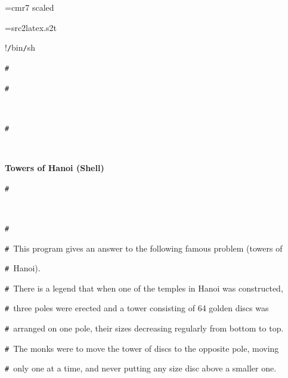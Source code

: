 \documentclass{article}
\begin{document}
\ifx\sevenrm\undefined
  \font\sevenrm=cmr7 scaled 
\fi

\newread\MyStyle
\openin\MyStyle=src2latex.s2t
\ifeof\MyStyle
  \closein\MyStyle
\else
  
  \closein\MyStyle
\fi

\def\mc{\relax}
\def\gt{\relax}
\def\sc{\scshape}

\tt\mc 

\noindent
\rm\mc {\tt\#}!{\tt /}bin{\tt /}sh

\noindent
\mbox{}{\tt\#}\  \hrulefill  \rm\mc 

\noindent
\mbox{}{\tt\#}
\tt\mc 

\noindent
\mbox{}\rm\mc {\tt\#}\  {}%

\noindent
\mbox{}{\tt\#}
\tt\mc 

\noindent
\mbox{}\rm\mc {\tt\#}\  {}\centerline{\bf Towers of Hanoi (Shell)}  \rm\mc 

\noindent
\mbox{}{\tt\#}
\tt\mc 

\noindent
\mbox{}\rm\mc {\tt\#}\  {}  \rm\mc 

\noindent
\mbox{}{\tt\#}\  {}\hspace{\leftmargini}\noindent  \rm\mc 

\noindent
\mbox{}{\tt\#}\  {}\hspace{\leftmargini}This program gives an answer to the following famous problem (towers of  \rm\mc 

\noindent
\mbox{}{\tt\#}\  {}\hspace{\leftmargini}Hanoi).  \rm\mc 

\noindent
\mbox{}{\tt\#}\  {}\hspace{\leftmargini}There is a legend that when one of the temples in Hanoi was constructed,  \rm\mc 

\noindent
\mbox{}{\tt\#}\  {}\hspace{\leftmargini}three poles were erected and a tower consisting of 64 golden discs was  \rm\mc 

\noindent
\mbox{}{\tt\#}\  {}\hspace{\leftmargini}arranged on one pole, their sizes decreasing regularly from bottom to top.  \rm\mc 

\noindent
\mbox{}{\tt\#}\  {}\hspace{\leftmargini}The monks were to move the tower of discs to the opposite pole, moving  \rm\mc 

\noindent
\mbox{}{\tt\#}\  {}\hspace{\leftmargini}only one at a time, and never putting any size disc above a smaller one.  \rm\mc 
\end{document}
